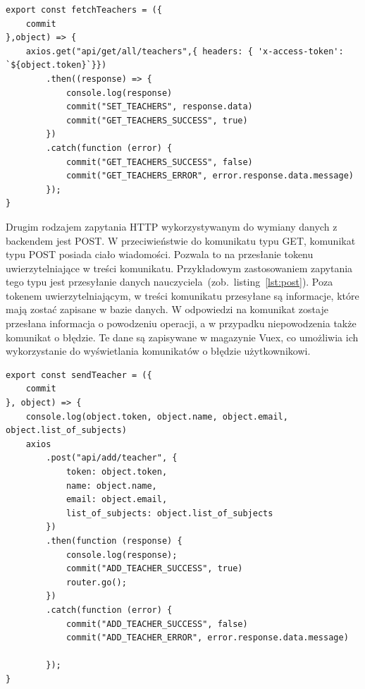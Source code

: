 \begin{lstlisting}[caption=Funkcja wykonująca zapytanie typu GET,label={lst:get}]
export const fetchTeachers = ({
    commit
},object) => {
    axios.get("api/get/all/teachers",{ headers: { 'x-access-token': `${object.token}`}})
        .then((response) => {
            console.log(response)
            commit("SET_TEACHERS", response.data)
            commit("GET_TEACHERS_SUCCESS", true)
        })
        .catch(function (error) {
            commit("GET_TEACHERS_SUCCESS", false)
            commit("GET_TEACHERS_ERROR", error.response.data.message)
        });
}
\end{lstlisting}
Drugim rodzajem zapytania HTTP wykorzystywanym do wymiany danych z backendem jest POST. W przeciwieństwie do komunikatu typu GET, komunikat typu POST posiada ciało wiadomości. Pozwala to na przesłanie tokenu uwierzytelniające w treści komunikatu. Przykładowym zastosowaniem zapytania tego typu jest przesyłanie danych nauczyciela~(zob.~listing~\ref{lst:post}). Poza tokenem uwierzytelniającym, w treści komunikatu przesyłane są informacje, które mają zostać zapisane w bazie danych. W odpowiedzi na komunikat zostaje przesłana informacja o powodzeniu operacji, a w przypadku niepowodzenia także komunikat o błędzie. Te dane są zapisywane w magazynie Vuex, co umożliwia ich wykorzystanie do wyświetlania komunikatów o błędzie użytkownikowi.
\begin{lstlisting}[caption=Funkcja wykonująca zapytanie typu POST, label={lst:post}]
export const sendTeacher = ({
    commit
}, object) => {
    console.log(object.token, object.name, object.email, object.list_of_subjects)
    axios
        .post("api/add/teacher", {
            token: object.token,
            name: object.name,
            email: object.email,
            list_of_subjects: object.list_of_subjects
        })
        .then(function (response) {
            console.log(response);
            commit("ADD_TEACHER_SUCCESS", true)
            router.go();
        })
        .catch(function (error) {
            commit("ADD_TEACHER_SUCCESS", false)
            commit("ADD_TEACHER_ERROR", error.response.data.message)
            
        });
}
\end{lstlisting}




